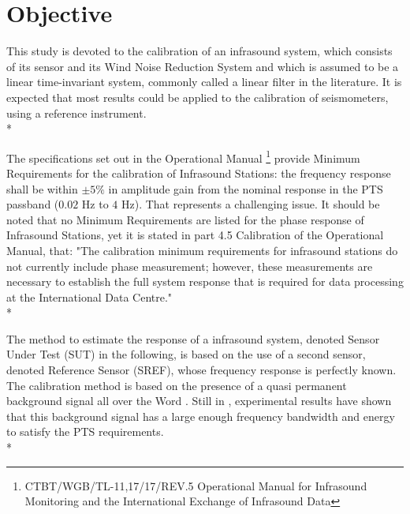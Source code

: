 \section{Objective}


This study is devoted to the calibration of an infrasound system, which consists of its sensor and its Wind Noise Reduction System and which is assumed to be a linear time-invariant system, commonly called a linear filter in the literature.  It is expected that most results could be applied to the calibration of seismometers, using a reference instrument.\\*

The specifications set out in the Operational Manual \footnote{CTBT/WGB/TL-11,17/17/REV.5 Operational Manual for Infrasound Monitoring and the International Exchange of Infrasound Data} provide Minimum Requirements for the calibration of Infrasound Stations: the frequency response shall be within $\pm 5\%$ in amplitude gain from the nominal response in the PTS passband ($0.02$ Hz to $4$ Hz). That represents a challenging issue. 
It should be noted that no Minimum Requirements are listed for the phase response of Infrasound Stations, yet it is stated in part 4.5 Calibration of the Operational Manual, that: "The calibration minimum requirements for infrasound stations do not currently include phase measurement; however, these measurements are necessary to establish the full system response that is required for data processing at the International Data Centre."\\*




The method to estimate the response of a infrasound system, denoted Sensor Under Test (SUT) in the following, is based on the use of a second sensor, denoted Reference Sensor (SREF), whose frequency response is perfectly known. The calibration method is based on the presence of a quasi permanent background signal all over the Word \cite{?}.  Still in \cite{?}, experimental results have shown that this background signal has a large enough frequency bandwidth and energy to satisfy the PTS requirements. \\*


